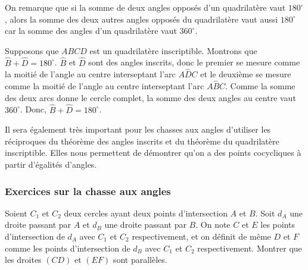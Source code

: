 On remarque que si la somme de deux angles opposés d'un quadrilatère vaut $180^\circ$, alors la somme des deux autres angles opposés du quadrilatère vaut aussi $180^\circ$ car la somme des angles d'un quadrilatère vaut $360^\circ$.

\begin{preuve}
Supposons que $ABCD$ est un quadrilatère inscriptible. Montrons que $\widehat{B}+\widehat{D}=180^\circ$.
$\widehat{B}$ et $\widehat{D}$ sont des angles inscrits, donc le premier se mesure comme la moitié de l'angle au centre interseptant l'arc $\stackrel \frown{ADC}$ et le deuxième se mesure comme la moitié de l'angle au centre interseptant l'arc $\stackrel \frown{ABC}$. Comme la somme des deux arcs donne le cercle complet, la somme des deux angles au centre vaut $360^\circ$. Donc, $\widehat{B}+\widehat{D}=180^\circ$.
\end{preuve}

Il sera également très important pour les chasses aux angles d'utiliser les réciproques du théorème des angles inscrits et du théorème du quadrilatère inscriptible. Elles nous permettent de démontrer qu'on a des points cocycliques à partir d'égalités d'angles.

\subsubsection{Exercices sur la chasse aux angles}
\begin{exo}
Soient $C_{1}$ et $C_{2}$ deux cercles ayant deux points d'intersection
$A$ et $B$. Soit $d_{A}$ une droite passant par $A$ et $d_{B}$
une droite passant par $B$. On note $C$ et $E$ les points d'intersection
de $d_{A}$ avec $C_{1}$ et $C_{2}$ respectivement, et on définit
de même $D$ et $F$ comme les points d'intersection de $d_{B}$ avec
$C_{1}$ et $C_{2}$ respectivement. Montrer que les droites $(CD)$
et $(EF)$ sont parallèles.
\end{exo}

